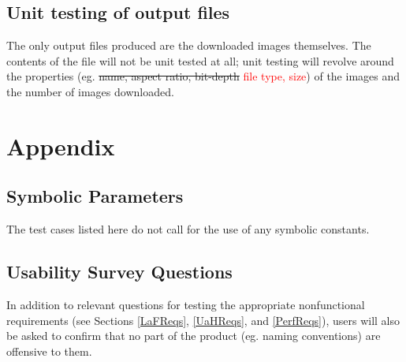 \documentclass[12pt, titlepage]{article}
\begin{document}
\subsection{Unit testing of output files}

The only output files produced are the downloaded images themselves. The contents of the file will not be unit 
tested at all; unit testing will revolve around the properties (eg. \sout{name, aspect ratio, bit-depth} \textcolor{red}{
file type, size}) of the images and the number of images downloaded.

%

%

\newpage

\section{Appendix}

\subsection{Symbolic Parameters}

The test cases listed here do not call for the use of any symbolic constants.

\subsection{Usability Survey Questions}

In addition to relevant questions for testing the appropriate nonfunctional requirements (see Sections \ref{LaFReqs}, \ref{UaHReqs}, and \ref{PerfReqs}), users will also be asked to confirm that no part of the product (eg. naming conventions) are offensive to them.
\end{document}
